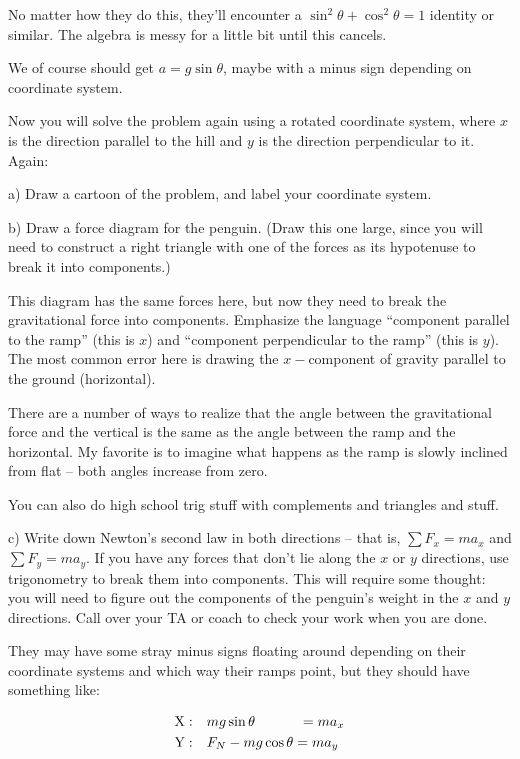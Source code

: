 \documentclass[12pt]{article}
\begin{document}
		{\color{Red}
			No matter how they do this, they'll encounter a $\sin^2 \theta + \cos^2 \theta = 1$ identity or similar. The algebra is messy for a little bit until this cancels.
			
			We of course should get $a = g \sin \theta$, maybe with a minus sign depending on coordinate system.
		}
		
		

		Now you will solve the problem again using a rotated coordinate system, where $x$ is the direction parallel to the hill and $y$ is the direction perpendicular to it. Again:
		
		a) Draw a cartoon of the problem, and label your coordinate system.

		
		b) Draw a force diagram for the penguin. (Draw this one large, since you will need to construct a right triangle
		with one of the forces as its hypotenuse to break it into components.)


{\color{Red}
This diagram has the same forces here, but now they need to break the gravitational force into components. Emphasize the language ``component parallel to the ramp'' (this is $x$) and ``component perpendicular to the ramp'' (this is $y$). The most common error here is drawing the $x-$component of gravity parallel to the ground (horizontal).

There are a number of ways to realize that the angle between the gravitational force and the vertical is the same as the angle between the ramp and the horizontal. My favorite is to imagine what happens as the ramp is slowly inclined from flat -- both angles increase from zero.

You can also do high school trig stuff with complements and triangles and stuff.
}
		
		
		c) Write down Newton's second law in both directions -- that is, $\sum F_x = ma_x$ and $\sum F_y = ma_y$.
		If you have any forces that don't lie along the $x$ or $y$ directions, use trigonometry to break them into components.
		This will require some thought: you will need to figure out the components of the
		penguin's weight in the $x$ and $y$ directions. Call over your TA or coach to check your work when you are done.

{\color{Red}
	They may have some stray minus signs floating around depending on their coordinate systems and which way their ramps point, but they should have something like:
	
	\begin{align*}
	\rm X:\hspace{1em}& mg \sin \theta \hspace{1.1cm}= ma_x \\
	\rm Y:\hspace{1em}& F_N - mg \cos \theta = ma_y
	\end{align*}
}
		
\end{document}
